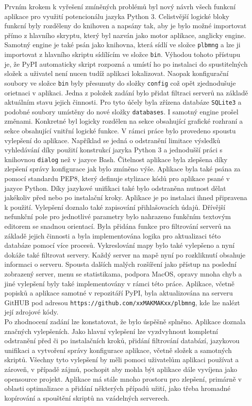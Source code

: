 \documentclass[%
  12pt,       				%
  a4paper,    				%
	unicode,						%
]{report}				    	%
\begin{document}
Prvním krokem k vyřešení zmíněných problémů byl nový návrh všech funkcní aplikace pro využití potencionálu jazyka Python 3. Celistvější logické bloky funkcní byly rozděleny do knihoven a napsány tak, aby je bylo možné importovat přímo z hlavního skryptu, který byl nazván jako motor aplikace, anglicky engine. Samotný engine je také psán jako knihovna, která sídlí ve složce \texttt{plbmng} a lze ji importovat z hlavního skriptu sídílícím ve složce \texttt{bin}. Výhodou tohoto přístupu je, že PyPI automaticky skript rozpozná a umístí ho po instalaci do spustitelných složek a uživatel není nucen tudíž aplikaci lokalizovat. Naopak konfigurační soubory ve složce \texttt{bin} byly přesunuty do složky \texttt{config} což opět zjednodušuje orietnaci v aplikaci. Jedna z položek zadání bylo přidat filtraci serverů na základě aktuálním stavu jejich činnosti. Pro tyto účely byla zřízena databáze \texttt{SQLite3} a podobné soubory umístěny do nové složky \texttt{databases}. I samotný engine prošel změnami. Konkretné byl logicky rozdělen na sekce obsahující grafické rozhraní a sekce obsahující vnitřní logické funkce. V rámci práce bylo provedeno spoustu vylepšení do aplikace. Například se jedná o odstranění limitace výsledků vyhledávání díky použití konstrukcí jazyka Python 3 a jednodušší práci s knihovnou \texttt{dialog} než v jazyce Bash. Čitelnost aplikace byla zlepšena díky zlepšení správy konfigurace jak bylo zmíněno výše. Aplikace byla také psána za pomocí standardu PEP8, který definuje stylizace kódů pro aplikace psané v jazyce Python. Díky jazykové unifikaci také bylo odstraněna nutnost dělat jakékoliv před nebo po instalační kroky. Aplikace je po instalaci ihned připravena k použití. Vylepšení doznalo také zapisování přihlašovacích údajů. Dřívější nefunkční pole pro jednotlivé parametry bylo nahrazeno funkčním textovým editorem se snadnou orientací. Byla přidána funkce pro filtrování serverů na základě jejich činnosti a byla implementována logika pro aktualizaci této databáze pomocí více procesů. Vykreslování mapy bylo také vylepšeno a nyní dokáže také filtrovat servery. Každý server na mapě nyní po rozkliknutí obsahuje informaci o serveru. Spousta dalších malých rozšíření jako přístup na poslední zobrazený server, menu se statistikama, podpora MacOS, opravy mnoha chyb a jiné vylepšení byly také implementovány v rámci této práce. Aplikace, včetně popisků a aplikace samotné v repozitáří PyPI, byla aktualizována na serveru GitHUB pod adresou \texttt{https://github.com/xxMAKMAKxx/plbmng}, kde lze nalézt její zdrojové kódy.\\
Po zhodnocení zadání lze konstatovat, že bylo úspěšně splněno. Aplikace doznala značných vylepšeních. Jako hlavní vylepšení lze vyzdvyhnout kompletní odstranění před či po instalačních kroků, přidání filtrování databází, jazykovou unifikaci a vytvoření správy konfigurace aplikace, včetně složek a samotných skriptů. Všechny tyto vylepšení by měli pomoci uživatelům aplikaci používat a zároveň, v případě zájmů, pochopit aby mohla být aplikace dále vyvíjena jako opensource projekt. Aplikace má stále mnoho prostoru pro zlepšení, primárně v oblasti optimalizace a přidání některých případů užití, jako třeba hromadné kopírování a spouštění skriptů na vzádelných serverech.\\
\end{document}
